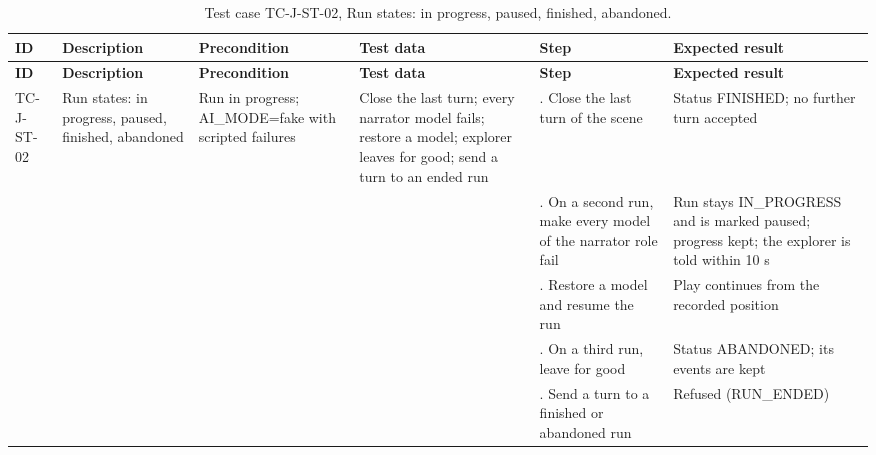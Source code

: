 {\footnotesize{}\renewcommand{\arraystretch}{1.1}
\begin{longtable}{|>{\raggedright\arraybackslash}p{}|>{\raggedright\arraybackslash}p{}|>{\raggedright\arraybackslash}p{}|>{\raggedright\arraybackslash}p{}|>{\raggedright\arraybackslash}p{}|>{\raggedright\arraybackslash}p{}|}
\caption{Test case TC-J-ST-02, Run states: in progress, paused, finished, abandoned.} \\
\hline
\textbf{ID} & \textbf{Description} & \textbf{Precondition} & \textbf{Test data} & \textbf{Step} & \textbf{Expected result} \\ \hline
\endfirsthead
\hline
\textbf{ID} & \textbf{Description} & \textbf{Precondition} & \textbf{Test data} & \textbf{Step} & \textbf{Expected result} \\ \hline
\endhead
TC-J-ST-02 & Run states: in progress, paused, finished, abandoned & Run in progress; AI\_\allowbreak{}MODE=fake with scripted failures & Close the last turn; every narrator model fails; restore a model; explorer leaves for good; send a turn to an ended run & 1. Close the last turn of the scene & Status FINISHED; no further turn accepted \\ \cline{5-6}
 &  &  &  & 2. On a second run, make every model of the narrator role fail & Run stays IN\_PROGRESS and is marked paused; progress kept; the explorer is told within 10 s \\ \cline{5-6}
 &  &  &  & 3. Restore a model and resume the run & Play continues from the recorded position \\ \cline{5-6}
 &  &  &  & 4. On a third run, leave for good & Status ABANDONED; its events are kept \\ \cline{5-6}
 &  &  &  & 5. Send a turn to a finished or abandoned run & Refused (RUN\_ENDED) \\ \hline
\end{longtable}
}

